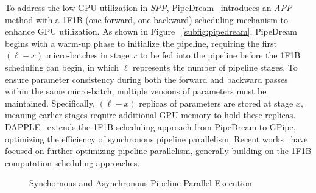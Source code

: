 To address the low GPU utilization in \emph{SPP}, PipeDream~\cite{narayananPipeDreamGeneralizedPipeline2019}
introduces an \emph{APP} method with a 1F1B (one forward, one backward) scheduling mechanism to enhance GPU utilization.
As shown in Figure ~\ref{subfig:pipedream}, PipeDream begins with a warm-up phase to initialize the pipeline,
requiring the first $(\ell-x)$ micro-batches in stage $x$ to be fed into the pipeline before the 1F1B scheduling can begin,
in which $\ell$ represents the number of pipeline stages.
To ensure parameter consistency during both the forward and backward passes within the same micro-batch,
multiple versions of parameters must be maintained.
Specifically, $(\ell-x)$ replicas of parameters are stored at stage $x$,
meaning earlier stages require additional GPU memory to hold these replicas.
DAPPLE~\cite{fanDAPPLEPipelinedData2021} extends the 1F1B scheduling approach from PipeDream to GPipe,
optimizing the efficiency of synchronous pipeline parallelism.
Recent works~\cite{sunAdaPipeOptimizingPipeline2024,zhaoVPipeVirtualizedAcceleration2022,liChimeraEfficientlyTraining2021,kimBPipeMemoryBalancedPipeline2023}
have focused on further optimizing pipeline parallelism,
generally building on the 1F1B computation scheduling approaches.
\begin{figure}[htb]
  \centering
  \caption{Synchornous and Asynchronous Pipeline Parallel Execution}
  \label{fig:pp-exec}
\end{figure}

